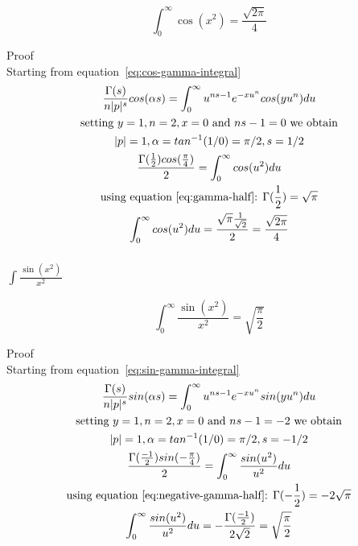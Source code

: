\documentclass[a4paper]{article}
\begin{document}
    \begin{theorem}
        \begin{equation}
            \boxed{
                \int_{0}^{\infty} \cos(x^2) = \frac{\sqrt{2\pi}}{4}
            }\label{eq:equation20}
        \end{equation}

        Proof
        \\
        Starting from equation~\ref{eq:cos-gamma-integral}
        \begin{gather*}
            \frac{\Gamma(s)}{n |p|^s} cos(\alpha s)= \int_{0}^{\infty} u^{ns -1} e^{-x u^{n}} cos(y u^n) du
            \\
            \text{setting $y=1, n=2, x=0$ and $ns -1 = 0$ we obtain}
            \\
            |p| = 1, \alpha = tan^{-1}(1/0) = \pi/2, s = 1/2
            \\
            \frac{\Gamma(\frac{1}{2}) cos(\frac{\pi}{4})}{2} = \int_{0}^{\infty} cos(u^2) du
            \\
            \text{using equation~\ref{eq:gamma-half}: } \Gamma(\frac{1}{2}) = \sqrt{\pi}
            \\
            \int_{0}^{\infty} cos(u^2) du = \frac{\sqrt{\pi} \frac{1}{\sqrt{2}}}{2}
            = \frac{\sqrt{2\pi}}{4}
        \end{gather*}
    \end{theorem}

    \subsubsection{$\int \frac{\sin(x^2)}{x^2}$}

    \begin{theorem}
        \begin{equation}
            \boxed{
                \int_{0}^{\infty} \frac{\sin(x^2)}{x^2} = \sqrt{\frac{\pi}{2}}
            }\label{eq:equation21}
        \end{equation}

        Proof
        \\
        Starting from equation~\ref{eq:sin-gamma-integral}
        \begin{gather*}
            \frac{\Gamma(s)}{n |p|^s} sin(\alpha s)= \int_{0}^{\infty} u^{ns -1} e^{-x u^{n}} sin(y u^n) du
            \\
            \text{setting $y=1, n=2, x=0$ and $ns -1 = -2$ we obtain}
            \\
            |p| = 1, \alpha = tan^{-1}(1/0) = \pi/2, s = -1/2
            \\
            \frac{\Gamma(\frac{-1}{2}) sin(-\frac{\pi}{4})}{2} = \int_{0}^{\infty} \frac{sin(u^2)}{u^2} du
            \\
            \text{using equation~\ref{eq:negative-gamma-half}: } \Gamma(-\frac{1}{2}) = -2\sqrt{\pi}
            \\
            \int_{0}^{\infty} \frac{sin(u^2)}{u^2} du = -\frac{\Gamma(\frac{-1}{2})}{2\sqrt{2}} =
            \sqrt{\frac{\pi}{2}}
        \end{gather*}
    \end{theorem}
\end{document}
